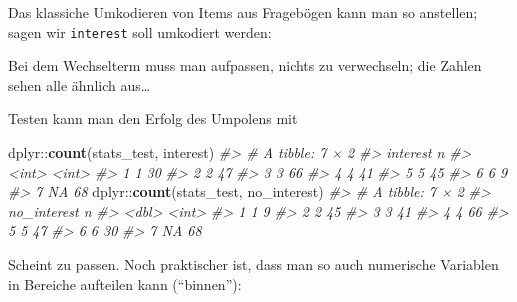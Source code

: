 \documentclass[12pt,ngerman,]{book}
\makeatletter
\newenvironment{Shaded}{\begin{snugshade}}{\end{snugshade}}
\newcommand{\KeywordTok}[1]{\textcolor[rgb]{0.13,0.29,0.53}{\textbf{{#1}}}}
\newcommand{\StringTok}[1]{\textcolor[rgb]{0.31,0.60,0.02}{{#1}}}
\newcommand{\CommentTok}[1]{\textcolor[rgb]{0.56,0.35,0.01}{\textit{{#1}}}}
\newcommand{\NormalTok}[1]{{#1}}
\newenvironment{kframe}{%
\medskip{}
\setlength{\fboxsep}{.8em}
 \def\at@end@of@kframe{}%
 \ifinner\ifhmode%
  \def\at@end@of@kframe{\end{minipage}}%
  \begin{minipage}{\columnwidth}%
 \fi\fi%
 \def\FrameCommand##1{\hskip\@totalleftmargin \hskip-\fboxsep
 \colorbox{shadecolor}{##1}\hskip-\fboxsep
     \hskip-\linewidth \hskip-\@totalleftmargin \hskip\columnwidth}%
 \MakeFramed {\advance\hsize-\width
   \@totalleftmargin\z@ \linewidth\hsize
   \@setminipage}}%
 {\par\unskip\endMakeFramed%
 \at@end@of@kframe}
\renewenvironment{Shaded}{\begin{kframe}}{\end{kframe}}
\makeatother
\begin{document}
Das klassiche Umkodieren von Items aus Fragebögen kann man so anstellen;
sagen wir \texttt{interest} soll umkodiert werden:

\begin{Shaded}
\end{Shaded}

Bei dem Wechselterm muss man aufpassen, nichts zu verwechseln; die
Zahlen sehen alle ähnlich aus\ldots{}

Testen kann man den Erfolg des Umpolens mit

\begin{Shaded}
\begin{Highlighting}[]
\NormalTok{dplyr::}\KeywordTok{count}\NormalTok{(stats_test, interest)}
\CommentTok{#> # A tibble: 7 × 2}
\CommentTok{#>   interest     n}
\CommentTok{#>      <int> <int>}
\CommentTok{#> 1        1    30}
\CommentTok{#> 2        2    47}
\CommentTok{#> 3        3    66}
\CommentTok{#> 4        4    41}
\CommentTok{#> 5        5    45}
\CommentTok{#> 6        6     9}
\CommentTok{#> 7       NA    68}
\NormalTok{dplyr::}\KeywordTok{count}\NormalTok{(stats_test, no_interest)}
\CommentTok{#> # A tibble: 7 × 2}
\CommentTok{#>   no_interest     n}
\CommentTok{#>         <dbl> <int>}
\CommentTok{#> 1           1     9}
\CommentTok{#> 2           2    45}
\CommentTok{#> 3           3    41}
\CommentTok{#> 4           4    66}
\CommentTok{#> 5           5    47}
\CommentTok{#> 6           6    30}
\CommentTok{#> 7          NA    68}
\end{Highlighting}
\end{Shaded}

Scheint zu passen. Noch praktischer ist, dass man so auch numerische
Variablen in Bereiche aufteilen kann (``binnen''):

\begin{Shaded}
\end{Shaded}
\end{document}
